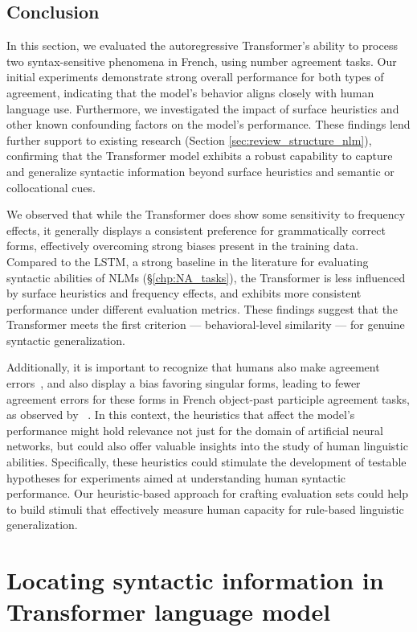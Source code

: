 \subsection{Conclusion}
In this section, we evaluated the autoregressive Transformer's ability to process two syntax-sensitive phenomena in French, using number agreement tasks. Our initial experiments demonstrate strong overall performance for both types of agreement, indicating that the model's behavior aligns closely with human language use. Furthermore, we investigated the impact of surface heuristics and other known confounding factors on the model's performance. These findings lend further support to existing research (Section \ref{sec:review_structure_nlm}), confirming that the Transformer model exhibits a robust capability to capture and generalize syntactic information beyond surface heuristics and semantic or collocational cues. 

We observed that while the Transformer does show some sensitivity to frequency effects, it generally displays a consistent preference for grammatically correct forms, effectively overcoming strong biases present in the training data. Compared to the LSTM, a strong baseline in the literature for evaluating syntactic abilities of NLMs (\S\ref{chp:NA_tasks}), the Transformer is less influenced by surface heuristics and frequency effects, and exhibits more consistent performance under different evaluation metrics. These findings suggest that the Transformer meets the first criterion --- behavioral-level similarity --- for genuine syntactic generalization.

Additionally, it is important to recognize that humans also make agreement errors~\citep{BOCK199145}, and also display a bias favoring singular forms, leading to fewer agreement errors for these forms in French object-past participle agreement tasks, as observed by ~\cite{villata2017intervention}. In this context, the heuristics that affect the model's performance might hold relevance not just for the domain of artificial neural networks, but could also offer valuable insights into the study of human linguistic abilities. Specifically, these heuristics could stimulate the development of testable hypotheses for experiments aimed at understanding human syntactic performance. Our heuristic-based approach for crafting evaluation sets could help to build stimuli that effectively measure human capacity for rule-based linguistic generalization.


\section{Locating syntactic information in Transformer language model} \label{sec:probing_location}

